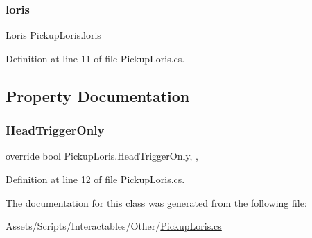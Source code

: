 \subsubsection{\texorpdfstring{loris}{loris}}
{\footnotesize\ttfamily \mbox{\hyperlink{class_loris}{Loris}} Pickup\+Loris.\+loris}



Definition at line 11 of file Pickup\+Loris.\+cs.



\subsection{Property Documentation}
\mbox{\label{class_pickup_loris_af8e991c2de897fd9e08336c60cfdf52d}} 
\subsubsection{\texorpdfstring{Head\+Trigger\+Only}{HeadTriggerOnly}}
{\footnotesize\ttfamily override bool Pickup\+Loris.\+Head\+Trigger\+Only\hspace{0.3cm}{\ttfamily [get]}, {\ttfamily [set]}, {\ttfamily [protected]}}



Definition at line 12 of file Pickup\+Loris.\+cs.



The documentation for this class was generated from the following file\+:\begin{DoxyCompactItemize}
\item 
Assets/\+Scripts/\+Interactables/\+Other/\mbox{\hyperlink{_pickup_loris_8cs}{Pickup\+Loris.\+cs}}\end{DoxyCompactItemize}
